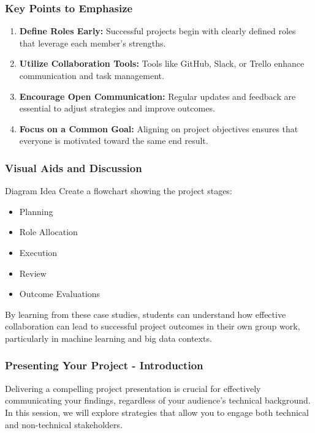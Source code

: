 \documentclass[aspectratio=169]{beamer}
\begin{document}
\begin{frame}[fragile]
    \frametitle{Key Points to Emphasize}
    \begin{enumerate}
        \item \textbf{Define Roles Early:} 
        Successful projects begin with clearly defined roles that leverage each member's strengths.
        
        \item \textbf{Utilize Collaboration Tools:} 
        Tools like GitHub, Slack, or Trello enhance communication and task management.
        
        \item \textbf{Encourage Open Communication:} 
        Regular updates and feedback are essential to adjust strategies and improve outcomes.
        
        \item \textbf{Focus on a Common Goal:} 
        Aligning on project objectives ensures that everyone is motivated toward the same end result.
    \end{enumerate}
\end{frame}

\begin{frame}[fragile]
    \frametitle{Visual Aids and Discussion}
    \begin{block}{Diagram Idea}
        Create a flowchart showing the project stages: 
        \begin{itemize}
            \item Planning 
            \item Role Allocation 
            \item Execution 
            \item Review 
            \item Outcome Evaluations
        \end{itemize}
    \end{block}
    By learning from these case studies, students can understand how effective collaboration can lead to successful project outcomes in their own group work, particularly in machine learning and big data contexts.
\end{frame}

\begin{frame}[fragile]
    \frametitle{Presenting Your Project - Introduction}
    Delivering a compelling project presentation is crucial for effectively communicating your findings, regardless of your audience's technical background. In this session, we will explore strategies that allow you to engage both technical and non-technical stakeholders.
\end{frame}
\end{document}
